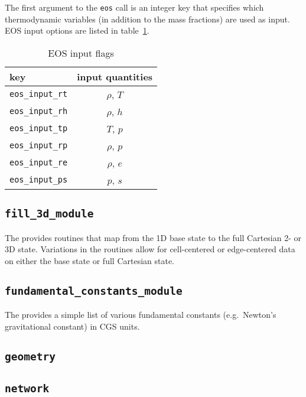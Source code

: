 The first argument to the {\tt eos} call is an integer key that
specifies which thermodynamic variables (in addition to the mass
fractions) are used as input.  EOS input options are listed 
in table~\ref{arch:table:eosinput}.

   \begin{table}[h]
   \caption{\label{arch:table:eosinput} EOS input flags}
   \begin{center}
   \begin{tabular}{lc}
   \hline
   key            & input quantities \\
   \hline
   {\tt eos\_input\_rt}       & $\rho$, $T$ \\
   {\tt eos\_input\_rh}       & $\rho$, $h$ \\
   {\tt eos\_input\_tp}       & $T$, $p$ \\
   {\tt eos\_input\_rp}       & $\rho$, $p$ \\
   {\tt eos\_input\_re}       & $\rho$, $e$ \\
   {\tt eos\_input\_ps}       & $p$, $s$ \\
   \hline
   \end{tabular}
   \end{center}
   \end{table}



\subsection{{\tt fill\_3d\_module}}

The  provides routines that map from the 1D
base state to the full Cartesian 2- or 3D state.  Variations in the
routines allow for cell-centered or edge-centered data on either the
base state or full Cartesian state.

\subsection{\tt fundamental\_constants\_module}

The  provides a simple list of
various fundamental constants (e.g.\ Newton's gravitational constant)
in CGS units.

\subsection{{\tt geometry}}

\subsection{{\tt network}}

